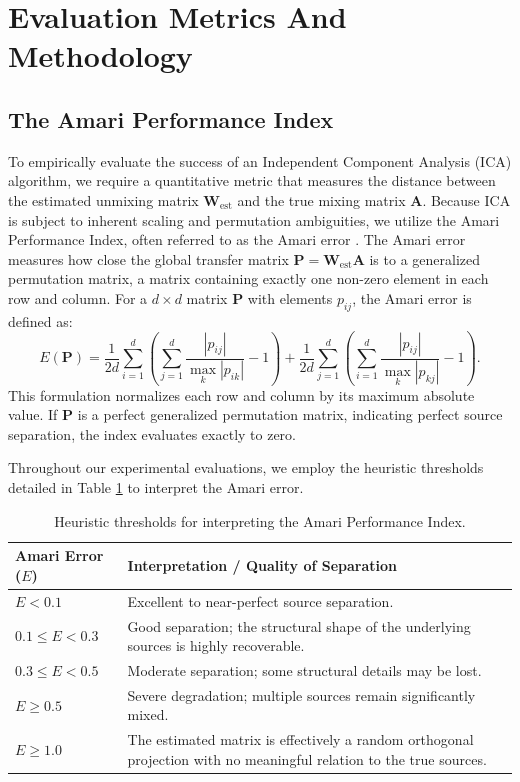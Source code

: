 \documentclass[12pt,a4paper,twoside,openany]{book}
\begin{document}
\section{Evaluation Metrics And Methodology}
\subsection{The Amari Performance Index}
To empirically evaluate the success of an Independent Component Analysis (ICA) algorithm, we require a quantitative metric that measures the distance between 
the estimated unmixing matrix $\mathbf{W}_{\text{est}}$ and the true mixing matrix $\mathbf{A}$. Because ICA is subject to inherent scaling and permutation ambiguities,
we utilize the Amari Performance Index, often referred to as the Amari error \cite{amari1996new}. 
The Amari error measures how close the global transfer matrix $\mathbf{P} = \mathbf{W}_{\text{est}} \mathbf{A}$ is to a generalized permutation matrix, 
a matrix containing exactly one non-zero element in each row and column. For a $d \times d$ matrix $\mathbf{P}$ with elements $p_{ij}$, the Amari error is defined as:
\begin{equation}
    E(\mathbf{P}) = \frac{1}{2d} \sum_{i=1}^d \left( \sum_{j=1}^d \frac{|p_{ij}|}{\max_k |p_{ik}|} - 1 \right) + \frac{1}{2d} \sum_{j=1}^d \left( \sum_{i=1}^d \frac{|p_{ij}|}{\max_k |p_{kj}|} - 1 \right).
\end{equation}
This formulation normalizes each row and column by its maximum absolute value. If $\mathbf{P}$ is a perfect generalized permutation matrix, indicating perfect source separation, 
the index evaluates exactly to zero. 

Throughout our experimental evaluations, we employ the heuristic thresholds detailed in Table \ref{tab:amari_thresholds} to interpret the Amari error.

\begin{table}[htbp]
    \centering
    \begin{tabular}{@{}lp{10cm}@{}}
        \toprule
        \textbf{Amari Error ($E$)} & \textbf{Interpretation / Quality of Separation} \\
        \midrule
        $E < 0.1$ & Excellent to near-perfect source separation. \\
        \addlinespace
        $0.1 \le E < 0.3$ & Good separation; the structural shape of the underlying sources is highly recoverable. \\
        \addlinespace
        $0.3 \le E < 0.5$ & Moderate separation; some structural details may be lost. \\
        \addlinespace
        $E \ge 0.5$ & Severe degradation; multiple sources remain significantly mixed. \\
        \addlinespace
        $E \ge 1.0$ & The estimated matrix is effectively a random orthogonal projection with no meaningful relation to the true sources. \\
        \bottomrule
    \end{tabular}
    \caption{Heuristic thresholds for interpreting the Amari Performance Index.}
    \label{tab:amari_thresholds}
\end{table}
\end{document}
